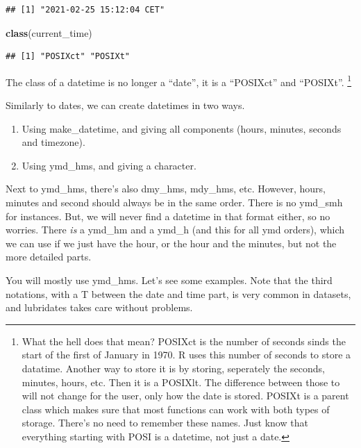 \documentclass[]{tufte-book}
\newenvironment{Shaded}{}{}
\newcommand{\KeywordTok}[1]{\textcolor[rgb]{0.00,0.44,0.13}{\textbf{#1}}}
\newcommand{\NormalTok}[1]{#1}
\providecommand{\tightlist}{%
  \setlength{\itemsep}{0pt}\setlength{\parskip}{0pt}}
\begin{document}
\begin{verbatim}
## [1] "2021-02-25 15:12:04 CET"
\end{verbatim}

\begin{Shaded}
\begin{Highlighting}[]
\KeywordTok{class}\NormalTok{(current_time)}
\end{Highlighting}
\end{Shaded}

\begin{verbatim}
## [1] "POSIXct" "POSIXt"
\end{verbatim}

The class of a datetime is no longer a ``date'', it is a ``POSIXct'' and ``POSIXt''. \footnote{What the hell does that mean? POSIXct is the number of seconds sinds the start of the first of January in 1970. R uses this number of seconds to store a datatime. Another way to store it is by storing, seperately the seconds, minutes, hours, etc. Then it is a POSIXlt. The difference between those to will not change for the user, only how the date is stored. POSIXt is a parent class which makes sure that most functions can work with both types of storage. There's no need to remember these names. Just know that everything starting with POSI is a datetime, not just a date.}

Similarly to dates, we can create datetimes in two ways.

\begin{enumerate}
\def\labelenumi{\arabic{enumi}.}
\tightlist
\item
  Using make\_datetime, and giving all components (hours, minutes, seconds and timezone).
\item
  Using ymd\_hms, and giving a character.
\end{enumerate}

Next to ymd\_hms, there's also dmy\_hms, mdy\_hms, etc. However, hours, minutes and second should always be in the same order. There is no ymd\_smh for instances. But, we will never find a datetime in that format either, so no worries. There \emph{is} a ymd\_hm and a ymd\_h (and this for all ymd orders), which we can use if we just have the hour, or the hour and the minutes, but not the more detailed parts.

You will mostly use ymd\_hms. Let's see some examples. Note that the third notations, with a T between the date and time part, is very common in datasets, and lubridates takes care without problems.
\end{document}
